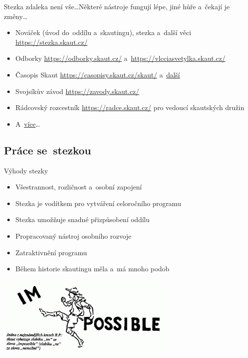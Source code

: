 \documentclass[compress, ucs, xelatex, 11pt, xcolor=dvipsnames, print, aspectratio=169,
	hyperref={
		bookmarks=true,
		unicode=true,
		colorlinks=true,
		pdftitle={Skautska vychovna metoda},
		plainpages=false,
		pdfauthor={Vojtech Zeisek},
		pdfsubject={Skautska vychovna metoda a jeji vyvoj za posledni stoleti a desetileti},
		pdfcreator={XeLaTeX},
		pdfkeywords={Junak, Pedagogika, Skaut, Skauting, Vychovna metoda},
		linkcolor=Red, %
		anchorcolor=ForestGreen, %
		citecolor=ForestGreen, %
		filecolor=ForestGreen, %
		menucolor=ForestGreen, %
		urlcolor=Sepia, %
		pdftex},
	url={hyphens, lowtilde} %
	]{beamer}
\begin{document}
\begin{frame}{Stezka zdaleka není vše\ldots}{Některé nástroje fungují lépe, jiné hůře a~čekají je změny\ldots}
	\begin{itemize}
		\item Nováček (úvod do~oddílu a~skautingu), stezka a~další věci \url{https://stezka.skaut.cz/}
		\item Odborky \url{https://odborky.skaut.cz/} a~\url{https://vlcciasvetylka.skaut.cz/}
		\item Časopis Skaut \url{https://casopisy.skaut.cz/skaut/} a~\href{https://casopisy.skaut.cz/}{další}
		\item Svojsíkův závod \url{https://zavody.skaut.cz/}
		\item Rádcovský rozcestník \url{https://radce.skaut.cz/} pro vedoucí skautských družin
		\item A~\href{https://krizovatka.skaut.cz/vedu-oddil}{více}\ldots
	\end{itemize}
\end{frame}

\subsection{Práce se~stezkou}

\begin{frame}{Výhody stezky}
	\begin{itemize}
		\item Všestrannost, rozličnost a~osobní zapojení
		\item Stezka je vodítkem pro vytváření celoročního programu
		\item Stezka umožňuje snadné přizpůsobení oddílu
		\item Propracovaný nástroj osobního rozvoje
		\item Zatraktivnění programu
		\item Během historie skautingu měla a~má mnoho podob
	\end{itemize}
	\begin{center}
		\includegraphics[height=4cm]{im-possible_m.png}
	\end{center}
\end{frame}
\end{document}
